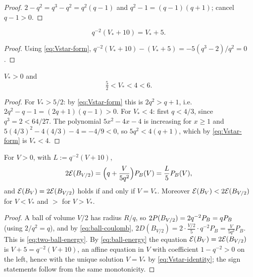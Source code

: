 \begin{proof}
$2-q^2=q^3-q^2=q^2(q-1)$ and $q^2-1=(q-1)(q+1)$; cancel $q-1>0$.
\end{proof}

\begin{lemma}\label{lem:Vstar-identity}
\begin{equation}\label{eq:Vstar-identity}
  q^{-2}(V_*+10)=V_*+5 .
\end{equation}
\end{lemma}

\begin{proof}
Using \eqref{eq:Vstar-form},
$q^{-2}(V_*+10)-(V_*+5)=-5(q^3-2)/q^2=0$.
\end{proof}

\begin{lemma}\label{lem:Vstar-bounds}
$V_*>0$ and
\begin{equation}\label{eq:Vstar-bounds}
  \tfrac52<V_*<4<6 .
\end{equation}
\end{lemma}

\begin{proof}
For $V_*>5/2$: by \eqref{eq:Vstar-form} this is $2q^2>q+1$, i.e.\
$2q^2-q-1=(2q+1)(q-1)>0$.  For $V_*<4$: first $q<4/3$, since
$q^3=2<64/27$.  The polynomial $5x^2-4x-4$ is increasing for $x\ge1$ and
$5(4/3)^2-4(4/3)-4=-4/9<0$, so $5q^2<4(q+1)$, which by
\eqref{eq:Vstar-form} is $V_*<4$.
\end{proof}

\begin{proposition}\label{prop:two-ball}
\uses{cor:ball-energy,def:threshold}
For $V>0$, with $L:=q^{-2}(V+10)$,
\begin{equation}\label{eq:two-ball-energy}
  2\mathcal E(B_{V/2})=\Bigl(q+\frac{V}{5q^2}\Bigr)P_B(V)=\frac L5P_B(V),
\end{equation}
and $\mathcal E(B_V)=2\mathcal E(B_{V/2})$ holds if and only if $V=V_*$.  Moreover
$\mathcal E(B_V)<2\mathcal E(B_{V/2})$ for $V<V_*$ and $>$ for $V>V_*$.
\end{proposition}

\begin{proof}
A ball of volume $V/2$ has radius $R/q$, so
$2P(B_{V/2})=2q^{-2}P_B=qP_B$ (using $2/q^2=q$), and by
\eqref{eq:ball-coulomb},
$2D(B_{V/2})=2\cdot\tfrac{V/2}{5}\cdot q^{-2}P_B=\tfrac{V}{5q^2}P_B$.  This is
\eqref{eq:two-ball-energy}.  By \eqref{eq:ball-energy} the equation
$\mathcal E(B_V)=2\mathcal E(B_{V/2})$ is $V+5=q^{-2}(V+10)$, an affine equation in $V$ with
coefficient $1-q^{-2}>0$ on the left, hence with the unique solution
$V=V_*$ by \eqref{eq:Vstar-identity}; the sign statements follow from the same
monotonicity.
\end{proof}

